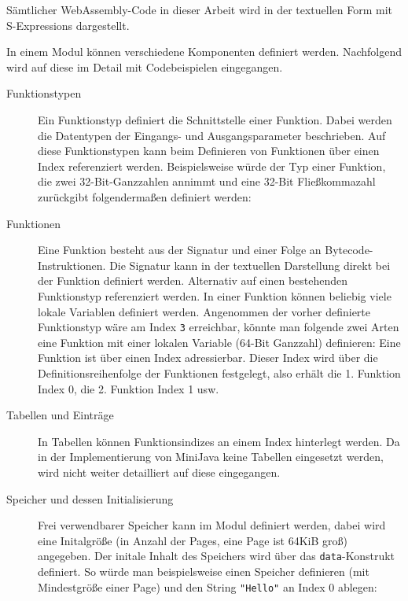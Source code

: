 

Sämtlicher WebAssembly-Code in dieser Arbeit wird in der textuellen Form mit S-Expressions dargestellt.

In einem Modul können verschiedene Komponenten definiert werden. Nachfolgend wird auf diese im Detail mit Codebeispielen eingegangen.

\begin{description}
    \item[Funktionstypen] Ein Funktionstyp definiert die Schnittstelle einer Funktion. Dabei werden die Datentypen der Eingangs- und Ausgangsparameter beschrieben. Auf diese Funktionstypen kann beim Definieren von Funktionen über einen Index referenziert werden. Beispielsweise würde der Typ einer Funktion, die zwei 32-Bit-Ganzzahlen annimmt und eine 32-Bit Fließkommazahl zurückgibt folgendermaßen definiert werden: 
    \item[Funktionen] Eine Funktion besteht aus der Signatur und einer Folge an Bytecode-Instruktionen. Die Signatur kann in der textuellen Darstellung direkt bei der Funktion definiert werden. Alternativ auf einen bestehenden Funktionstyp referenziert werden. In einer Funktion können beliebig viele lokale Variablen definiert werden. Angenommen der vorher definierte Funktionstyp wäre am Index \lstinline{3} erreichbar, könnte man folgende zwei Arten eine Funktion mit einer lokalen Variable (64-Bit Ganzzahl) definieren: 
    Eine Funktion ist über einen Index adressierbar. Dieser Index wird über die Definitionsreihenfolge der Funktionen festgelegt, also erhält die 1. Funktion Index 0, die 2. Funktion Index 1 usw.
    \item[Tabellen und Einträge] In Tabellen können Funktionsindizes an einem Index hinterlegt werden. Da in der Implementierung von MiniJava keine Tabellen eingesetzt werden, wird nicht weiter detailliert auf diese eingegangen.
    \item[Speicher und dessen Initialisierung] Frei verwendbarer Speicher kann im Modul definiert werden, dabei wird eine Initalgröße (in Anzahl der Pages, eine Page ist 64KiB groß) angegeben. Der initale Inhalt des Speichers wird über das \lstinline{data}-Konstrukt definiert. So würde man beispielsweise einen Speicher definieren (mit Mindestgröße einer Page) und den String \lstinline{"Hello"} an Index 0 ablegen: 

\end{description}
